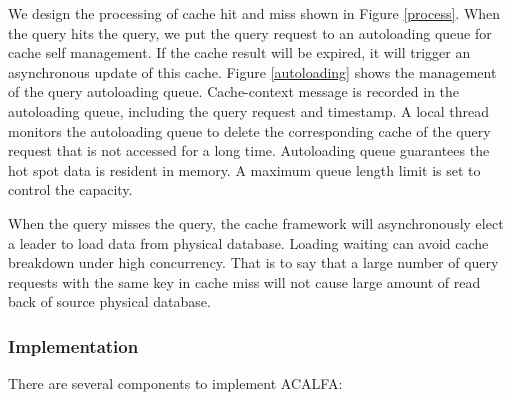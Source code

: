 \documentclass{singlecol-new}
\theoremstyle{TH}{
\newtheorem{lemma}{Lemma}
\newtheorem{theorem}[lemma]{Theorem}
\newtheorem{corrolary}[lemma]{Corrolary}
\newtheorem{conjecture}[lemma]{Conjecture}
\newtheorem{proposition}[lemma]{Proposition}
\newtheorem{claim}[lemma]{Claim}
\newtheorem{stheorem}[lemma]{Wrong Theorem}
}
\theoremstyle{THrm}{
\newtheorem{definition}{Definition}[section]
\newtheorem{question}{Question}[section]
\newtheorem{remark}{Remark}
\newtheorem{scheme}{Scheme}
}
\theoremstyle{THhit}{
\newtheorem{case}{Case}[section]
}
\begin{document}
We design the processing of cache hit and miss shown in Figure \ref{process}. When the query hits the query, we put the query request to an autoloading queue for cache self management. If the cache result will be expired, it will trigger an asynchronous update of this cache. Figure \ref{autoloading} shows the management of the query autoloading queue. Cache-context message is recorded in the autoloading queue, including the query request and timestamp. A local thread monitors the autoloading queue to delete the corresponding cache of the query request that is not accessed for a long time. Autoloading queue guarantees the hot spot data is resident in memory. A maximum queue length limit is set to control the capacity.

When the query misses the query, the cache framework will asynchronously elect a leader to load data from physical database. Loading waiting can avoid cache breakdown under high concurrency. That is to say that a large number of query requests with the same key in cache miss will not cause large amount of read back of source physical database.

\subsubsection{Implementation}
There are several components to implement ACALFA:
\end{document}
